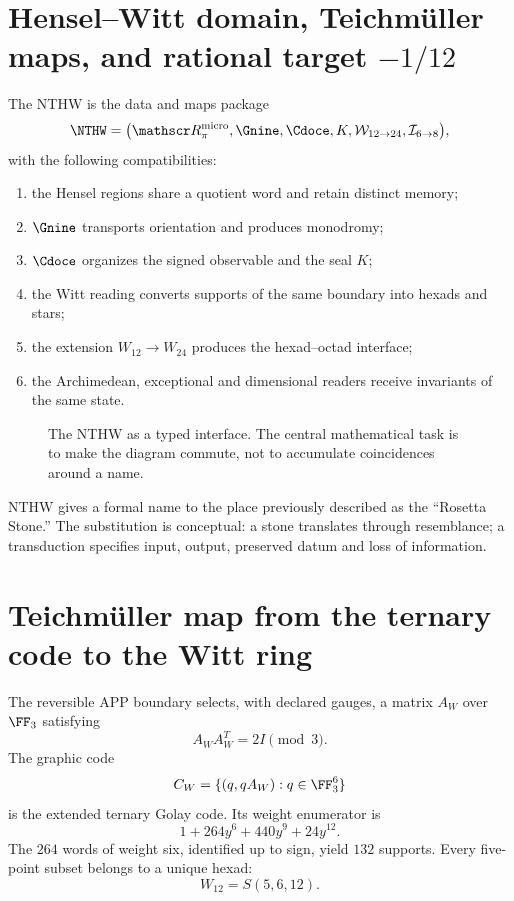 \label{chap:p3-83-27-menos_un_doceavo}

\section{Hensel--Witt domain, Teichmüller maps, and rational target \(-1/12\)}

The NTHW is the data and maps package
\[
\NTHW=
\bigl(
\mathscr R_\pi^{\rm micro},
\Gnine,
\Cdoce,
K,
\mathcal W_{12\to24},
\mathcal I_{6\to8}
\bigr),
\]
with the following compatibilities:
\begin{enumerate}
  \item the Hensel regions share a quotient word and retain
  distinct memory;
  \item \(\Gnine\) transports orientation and produces monodromy;
  \item \(\Cdoce\) organizes the signed observable and the seal \(K\);
  \item the Witt reading converts supports of the same boundary into hexads and
  stars;
  \item the extension \(W_{12}\to W_{24}\) produces the
  hexad--octad interface;
  \item the Archimedean, exceptional and dimensional readers receive
  invariants of the same state.
\end{enumerate}

\begin{figure}[!htbp]
\centering
\resizebox{\textwidth}{!}{}
\caption{The NTHW as a typed interface. The central mathematical task is to make
the diagram commute, not to accumulate coincidences around a name.}
\label{p3-83-c27-s1:fig:nthw}
\end{figure}

NTHW gives a formal name to the place previously described as the “Rosetta
Stone.” The substitution is conceptual: a stone translates through resemblance; a
transduction specifies input, output, preserved datum and loss of
information.

\section{Teichmüller map from the ternary code to the Witt ring}

The reversible APP boundary selects, with declared gauges, a matrix
\(A_W\) over \(\FF_3\) satisfying
\[
A_WA_W^T=2I\pmod3.
\]
The graphic code
\[
C_W=\{(q,qA_W):q\in\FF_3^6\}
\]
is the extended ternary Golay code. Its weight enumerator is
\[
1+264y^6+440y^9+24y^{12}.
\]
The \(264\) words of weight six, identified up to sign, yield \(132\)
supports. Every five-point subset belongs to a unique hexad:
\[
W_{12}=S(5,6,12).
\]

